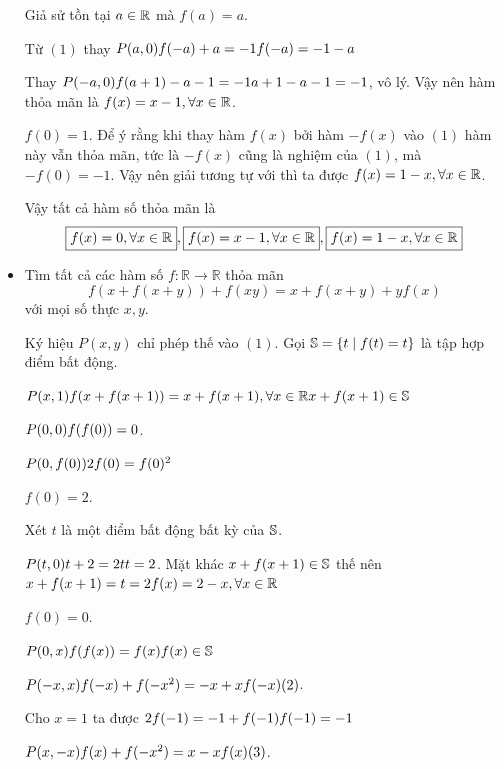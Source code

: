 \documentclass[11pt]{scrartcl}
\begin{document}
\begin{itemize}[label=, leftmargin=0em, itemsep=0.5em]
\begin{sol}
          Giả sử tồn tại $a \in \mathbb{R}$ mà $f(a) = a$. 
          
          Từ $(1)$ thay $P(a,0) \ra f(-a) + a = -1 \lra f(-a) = -1 - a$ 

          Thay $P(-a,0) \ra f(a + 1) -a - 1 = -1 \lra a + 1 - a - 1 = -1$, vô lý.
          Vậy nên hàm thỏa mãn là $f(x) = x - 1, \forall x\in \mathbb{R}$.

           $f(0) = 1$. Để ý rằng khi thay hàm $f(x)$ bởi hàm $-f(x)$ vào $(1)$ hàm này vẫn thỏa mãn, tức là $-f(x)$ cũng là nghiệm của $(1)$, mà $-f(0) = -1$. Vậy nên giải tương tự với  thì ta được $f(x) = 1 - x, \forall x\in \mathbb{R}$. 
    
          Vậy tất cả hàm số thỏa mãn là \[\boxed{f(x) = 0, \forall x\in \mathbb{R}}, \boxed{f(x) = x - 1, \forall x\in \mathbb{R}}, \boxed{f(x) = 1 - x, \forall x\in \mathbb{R}}\]
      \end{sol}



    \item \begin{bt}
        Tìm tất cả các hàm số $f: \mathbb{R} \to \mathbb{R}$ thỏa mãn
        \[
           f(x + f(x + y)) + f(xy) = x + f(x + y) + yf(x)\tag{1}
        \]
        với mọi số thực $x,y$.
    \end{bt}
    \begin{sol}
        Ký hiệu $P(x,y)$ chỉ phép thế vào $(1)$. Gọi $\mathbb{S} = \{t \mid f(t) = t\}$ là tập hợp điểm bất động. 

        $P(x,1) \ra f(x + f(x + 1))  = x + f(x + 1), \xr \ra x + f(x + 1) \in \bb{S}$ 

        $P(0,0) \ra f(f(0)) = 0$. 

        $P(0,f(0)) \ra 2f(0) = f(0)^2$

         $f(0) = 2$. 
       
        Xét $t$ là một điểm bất động bất kỳ của $\mathbb{S}$. 
        
        $P(t,0) \ra t + 2 = 2t \lra t = 2$. Mặt khác  $x + f(x + 1) \in \mathbb{S}$ thế nên $x + f(x + 1) = t = 2 \lra f(x) = 2 - x, \xr$
       
         $f(0) = 0$.

        $P(0,x) \ra f(f(x)) = f(x) \ra f(x) \in \bb{S}$ 


        $P(-x,x) \ra f(-x) + f(-x^2) = -x +xf(-x) (2)$. 
        
        Cho $x  = 1$ ta được $2f(-1) = -1 +f(-1) \ra f(-1) = -1$

        $P(x,-x) \ra f(x) + f(-x^2) = x -xf(x) (3)$. 
        

\end{sol}
\end{itemize}
\end{document}
